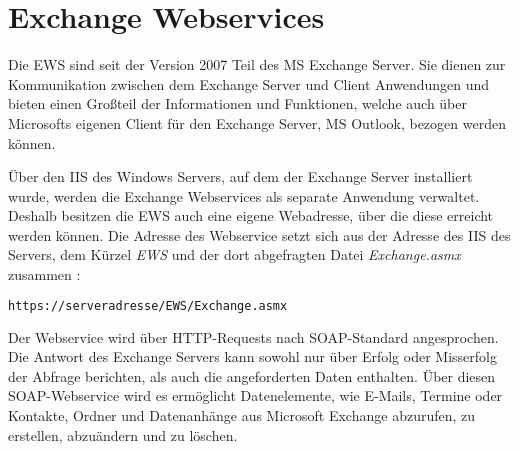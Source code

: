 \section{Exchange Webservices}

Die \ac{EWS} sind seit der Version 2007 Teil des \ac{MS} Exchange Server. \cite{MicrosoftCorporation.2010} Sie dienen zur Kommunikation zwischen dem Exchange Server und Client Anwendungen und bieten einen Großteil der Informationen und Funktionen, welche auch über Microsofts eigenen Client für den Exchange Server, \ac{MS} Outlook, bezogen werden können. \cite{MicrosoftCorporation.2010}

Über den \ac{IIS} des Windows Servers, auf dem der Exchange Server installiert wurde, werden die Exchange Webservices als separate Anwendung verwaltet. \cite{MicrosoftCorporation.2010} Deshalb besitzen die EWS auch eine eigene Webadresse, über die diese erreicht werden können. %
Die Adresse des Webservice setzt sich aus der Adresse des \ac{IIS} des Servers, dem Kürzel \emph{EWS} und der dort abgefragten Datei \emph{Exchange.asmx} zusammen \cite{MicrosoftCorporation.2014}:

\begin{lstlisting}[language=HTML] 
https://serveradresse/EWS/Exchange.asmx
\end{lstlisting}

Der Webservice wird über \ac{HTTP}-Requests nach \ac{SOAP}-Standard angesprochen. Die Antwort des Exchange Servers kann sowohl nur über Erfolg oder Misserfolg der Abfrage berichten, als auch die angeforderten Daten enthalten. \cite{MicrosoftCorporation.2009}
Über diesen \ac{SOAP}-Webservice wird es ermöglicht Datenelemente, wie E-Mails, Termine oder Kontakte, Ordner und Datenanhänge aus Microsoft Exchange abzurufen, zu erstellen, abzuändern und zu löschen. \cite{MicrosoftCorporation.2013}
